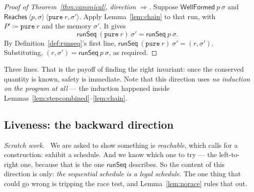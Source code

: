 \documentclass[11pt,a4paper]{article}
\theoremstyle{definition}
\theoremstyle{plain}
\theoremstyle{remark}
\newenvironment{scratch}{\par\medskip\noindent\textit{Scratch work.}\ \ignorespaces}{\par\medskip}
\newcommand{\st}{\sigma}
\newcommand{\runSeq}{\mathsf{runSeq}}
\newcommand{\wf}{\mathsf{WellFormed}}
\newcommand{\Reaches}{\mathsf{Reaches}}
\begin{document}
\begin{proof}[Proof of Theorem~\ref{thm:canonical}, direction $\Longrightarrow$]
Suppose $\wf\ p\ \st$ and
$\Reaches\ \langle p, \st\rangle\ \langle \texttt{pure}\ r, \st'\rangle$. Apply
Lemma~\ref{lem:chain} to that run, with $P' \coloneqq \texttt{pure}\ r$ and the memory
$\st'$. It gives
\[
  \runSeq\ (\texttt{pure}\ r)\ \st' = \runSeq\ p\ \st .
\]
By Definition~\ref{def:runseq}'s first line, $\runSeq\ (\texttt{pure}\ r)\ \st' = (r,\st')$.
Substituting, $(r,\st') = \runSeq\ p\ \st$, as required.
\end{proof}

Three lines. That is the payoff of finding the right invariant: once the conserved quantity is
known, safety is immediate. Note that this direction uses \emph{no induction on the program
at all} --- the induction happened inside Lemmas~\ref{lem:stepcombined}--\ref{lem:chain}.

\subsection{Liveness: the backward direction}\label{sec:canonical:live}

\begin{scratch}
We are asked to show something is \emph{reachable}, which calls for a construction: exhibit a
schedule. And we know which one to try --- the left-to-right one, because that is the one
$\runSeq$ describes. So the content of this direction is only: \emph{the sequential schedule
is a legal schedule}. The one thing that could go wrong is tripping the race test, and
Lemma~\ref{lem:norace} rules that out.
\end{scratch}
\end{document}
